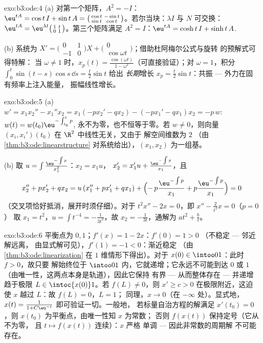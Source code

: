 \begin{solution}{exo:b3:ode:4}
(a) 对第一个矩阵，$A^2 = -I$：$\eu^{tA} = \cos t\,I + \sin
t\,A = \bigl(\begin{smallmatrix}\cos t & -\sin t\\ \sin t &
\cos t\end{smallmatrix}\bigr)$。若尔当块：$\lambda I$ 与
$N$ 可交换：$\eu^{tA} =
\eu^{\lambda t}\bigl(\begin{smallmatrix}1 & t\\ 0 &
1\end{smallmatrix}\bigr)$。第三个矩阵满足 $A^2 = I$：$\eu^{tA} =
\cosh t\,I + \sinh t\,A$.

(b) 系统为 $X' = \bigl(\begin{smallmatrix}0&1\\-1&0
\end{smallmatrix}\bigr)X + \bigl(\begin{smallmatrix}0\\
\cos\omega t\end{smallmatrix}\bigr)$；借助杜阿梅尔公式与旋转
的预解式可得特解：
当 $\omega \neq 1$ 时，$x_p(t) = \frac{\cos(\omega t)}{1 -
\omega^2}$（可直接验证）；对 $\omega = 1$，积分
$\int_0^t\sin(t - s)\cos s\,\dd s = \frac t2\sin t$ 给出
\emph{长期}增长 $x_p = \frac t2\sin t$：共振
--- 外力在固有频率上注入能量，
振幅线性增长。
\end{solution}

\begin{solution}{exo:b3:ode:5}
(a) $w' = x_1x_2'' - x_1''x_2 = x_1(-px_2' - qx_2) - (-px_1'
- qx_1)x_2 = -p\,w$: $w(t) = w(t_0)\eu^{-\int_{t_0}^tp}$,
永不为零，也不恒等于零。若 $w \neq 0$，则向量
$(x_i, x_i')(t_0)$ 在 $\R^2$ 中线性无关，又由于
解空间维数为 $2$
（由 \cref{thm:b3:ode:linearstructure} 对系统给出），$(x_1,
x_2)$ 为一组基。

(b) 取 $u = \int\frac{\eu^{-\int p}}{x_1^2}$：$x_2 = x_1u$，
$x_2' = x_1'u + \frac{\eu^{-\int p}}{x_1}$，且
\[
x_2'' + px_2' + qx_2
= u\,(x_1'' + px_1' + qx_1) +
\Bigl(-\,p\frac{\eu^{-\int p}}{x_1} +
p\frac{\eu^{-\int p}}{x_1}\Bigr) = 0
\]
（交叉项恰好抵消，展开时须仔细）。对于
$t^2x'' - 2x = 0$，即 $x'' - \frac2{t^2}x = 0$（$p = 0$）
取 $x_1 = t^2$，$u = \int t^{-4} = -\frac1{3t^3}$，故 $x_2
= -\frac1{3t}$，通解为 $at^2 + \frac bt$。
\end{solution}

\begin{solution}{exo:b3:ode:6}
平衡点为 $0, 1$；$f'(x) = 1 - 2x$：$f'(0) = 1 > 0$
（不稳定 --- 邻近解远离，
由显式解可见），$f'(1) = -1 < 0$：渐近稳定
（由 \cref{thm:b3:ode:linearization} 在 $1$ 维情形下得出）。对于
$x(0) \in \intoo01$：此时 $f > 0$，故只要
解始终位于 $\intoo01$ 内，它就递增；它永远不可能到达
$0$ 或 $1$（由唯一性，这两点本身是轨道），因此它保持
有界 --- 从而整体存在 --- 并递增趋于极限 $L
\in \intoc{x(0)}1$。若 $f(L) \neq 0$，则 $x' \geq c > 0$
在极限附近，这迫使 $x$ 越过 $L$：故 $f(L) = 0$，$L = 1$；
同理，$x \to 0$（在 $-\infty$ 处）。显式地，$x(t) =
\frac1{1 + C\eu^{-t}}$ 即可验证一切。一般地，
若标量自治方程的解满足 $x'(t_0) = 0$，则 $x(t_0)$
为平衡点，由唯一性知 $x$ 为常数；
否则 $f(x(t))$ 保持定号（它从不为零，
且 $t \mapsto f(x(t))$ 连续）：$x$ 严格
单调 --- 因此非常数的周期解
不可能存在。
\end{solution}

